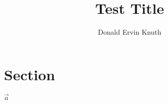 \documentclass{article}
\title{Test Title}
\author{Donald Ervin Knuth}
\begin{document}
\maketitle
\tableofcontents
\section{Section}
\(\vec a\)
\end{document}
